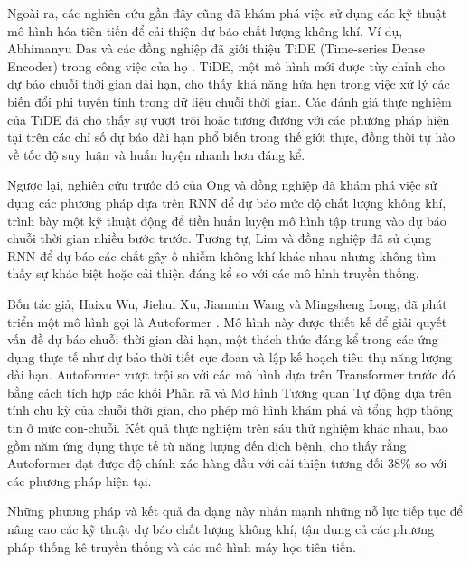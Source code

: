 Ngoài ra, các nghiên cứu gần đây cũng đã khám phá việc sử dụng các kỹ thuật mô hình hóa tiên tiến để cải thiện dự báo chất lượng không khí. Ví dụ, Abhimanyu Das và các đồng nghiệp đã giới thiệu TiDE (Time-series Dense Encoder) trong công việc của họ \cite{b5}. TiDE, một mô hình mới được tùy chỉnh cho dự báo chuỗi thời gian dài hạn, cho thấy khả năng hứa hẹn trong việc xử lý các biến đổi phi tuyến tính trong dữ liệu chuỗi thời gian. Các đánh giá thực nghiệm của TiDE đã cho thấy sự vượt trội hoặc tương đương với các phương pháp hiện tại trên các chỉ số dự báo dài hạn phổ biến trong thế giới thực, đồng thời tự hào về tốc độ suy luận và huấn luyện nhanh hơn đáng kể.

Ngược lại, nghiên cứu trước đó của Ong và đồng nghiệp \cite{b6} đã khám phá việc sử dụng các phương pháp dựa trên RNN để dự báo mức độ chất lượng không khí, trình bày một kỹ thuật động để tiền huấn luyện mô hình tập trung vào dự báo chuỗi thời gian nhiều bước trước. Tương tự, Lim và đồng nghiệp \cite{b7} đã sử dụng RNN để dự báo các chất gây ô nhiễm không khí khác nhau nhưng không tìm thấy sự khác biệt hoặc cải thiện đáng kể so với các mô hình truyền thống.

Bốn tác giả, Haixu Wu, Jiehui Xu, Jianmin Wang và Mingsheng Long, đã phát triển một mô hình gọi là Autoformer \cite{b8}. Mô hình này được thiết kế để giải quyết vấn đề dự báo chuỗi thời gian dài hạn, một thách thức đáng kể trong các ứng dụng thực tế như dự báo thời tiết cực đoan và lập kế hoạch tiêu thụ năng lượng dài hạn. Autoformer vượt trội so với các mô hình dựa trên Transformer trước đó bằng cách tích hợp các khối Phân rã và Mơ hình Tương quan Tự động dựa trên tính chu kỳ của chuỗi thời gian, cho phép mô hình khám phá và tổng hợp thông tin ở mức con-chuỗi. Kết quả thực nghiệm trên sáu thử nghiệm khác nhau, bao gồm năm ứng dụng thực tế từ năng lượng đến dịch bệnh, cho thấy rằng Autoformer đạt được độ chính xác hàng đầu với cải thiện tương đối 38\% so với các phương pháp hiện tại.

Những phương pháp và kết quả đa dạng này nhấn mạnh những nỗ lực tiếp tục để nâng cao các kỹ thuật dự báo chất lượng không khí, tận dụng cả các phương pháp thống kê truyền thống và các mô hình máy học tiên tiến.
